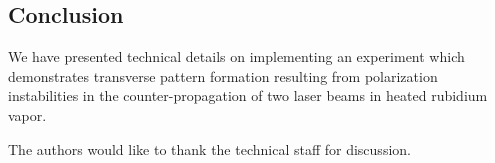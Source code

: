 \documentclass[aps,twocolumn,secnumarabic,balancelastpage,amsmath,amssymb,nofootinbib]{revtex4}
\begin{document}
\subsection*{Conclusion}
We have presented technical details on implementing an experiment which demonstrates transverse pattern formation resulting from polarization instabilities in the counter-propagation of two laser beams in heated rubidium vapor.



\begin{acknowledgments} 
The authors would like to thank the technical staff for discussion.
\end{acknowledgments}

\clearpage
\appendix
\end{document}
